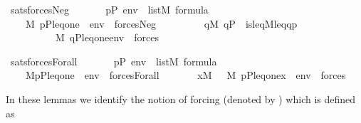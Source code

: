 \begin{isabelle}
\isamarkupfalse%
\ sats{\isacharunderscore}forces{\isacharunderscore}Neg{\isacharcolon}\isanewline
\ \ \isanewline
\ \ \ \ {\isachardoublequoteopen}p{\isasymin}P{\isachardoublequoteclose}\ {\isachardoublequoteopen}env\ {\isasymin}\ list{\isacharparenleft}M{\isacharparenright}{\isachardoublequoteclose}\ {\isachardoublequoteopen}{\isasymphi}{\isasymin}formula{\isachardoublequoteclose}\isanewline
\ \ \isanewline
\ \ \ \ {\isachardoublequoteopen}M{\isacharcomma}\ {\isacharbrackleft}p{\isacharcomma}P{\isacharcomma}leq{\isacharcomma}one{\isacharbrackright}\ {\isacharat}\ env\ {\isasymTurnstile}\ forces{\isacharparenleft}Neg{\isacharparenleft}{\isasymphi}{\isacharparenright}{\isacharparenright}\ \ \ {\isasymlongleftrightarrow}\ \isanewline
\ \ \ \ \ {\isasymnot}{\isacharparenleft}{\isasymexists}q{\isasymin}M{\isachardot}\ q{\isasymin}P\ {\isasymand}\ is{\isacharunderscore}leq{\isacharparenleft}{\isacharhash}{\isacharhash}M{\isacharcomma}leq{\isacharcomma}q{\isacharcomma}p{\isacharparenright}\ {\isasymand}\ \isanewline
\ \ \ \ \ \ \ \ \ \ M{\isacharcomma}\ {\isacharbrackleft}q{\isacharcomma}P{\isacharcomma}leq{\isacharcomma}one{\isacharbrackright}{\isacharat}env\ {\isasymTurnstile}\ forces{\isacharparenleft}{\isasymphi}{\isacharparenright}{\isacharparenright}{\isachardoublequoteclose}\isanewline

\isamarkupfalse%
\ sats{\isacharunderscore}forces{\isacharunderscore}Forall{\isacharcolon}\isanewline
\ \ \isanewline
\ \ \ \ {\isachardoublequoteopen}p{\isasymin}P{\isachardoublequoteclose}\ {\isachardoublequoteopen}env\ {\isasymin}\ list{\isacharparenleft}M{\isacharparenright}{\isachardoublequoteclose}\ {\isachardoublequoteopen}{\isasymphi}{\isasymin}formula{\isachardoublequoteclose}\isanewline
\ \ \isanewline
\ \ \ \ {\isachardoublequoteopen}M{\isacharcomma}{\isacharbrackleft}p{\isacharcomma}P{\isacharcomma}leq{\isacharcomma}one{\isacharbrackright}\ {\isacharat}\ env\ {\isasymTurnstile}\ forces{\isacharparenleft}Forall{\isacharparenleft}{\isasymphi}{\isacharparenright}{\isacharparenright}\ {\isasymlongleftrightarrow}\ \isanewline
\ \ \ \ \ {\isacharparenleft}{\isasymforall}x{\isasymin}M{\isachardot}\ \ \ M{\isacharcomma}\ {\isacharbrackleft}p{\isacharcomma}P{\isacharcomma}leq{\isacharcomma}one{\isacharcomma}x{\isacharbrackright}\ {\isacharat}\ env\ {\isasymTurnstile}\ forces{\isacharparenleft}{\isasymphi}{\isacharparenright}{\isacharparenright}{\isachardoublequoteclose}
\end{isabelle}
%
In these lemmas we identify the notion of forcing (denoted by
) which is defined as

